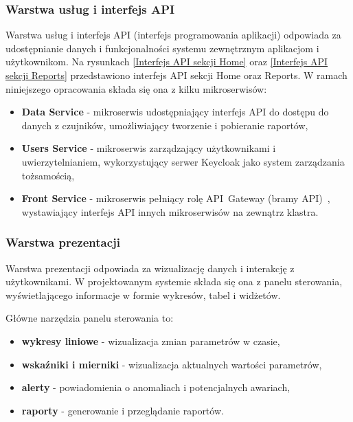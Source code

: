 \subsubsection{Warstwa usług i interfejs API}
\label{subsubsec:warstwa_uslug}

Warstwa usług i interfejs API (interfejs programowania aplikacji) odpowiada za udostępnianie danych i funkcjonalności systemu zewnętrznym aplikacjom i użytkownikom. Na rysunkach \ref{Interfejs API sekcji Home} oraz \ref{Interfejs API sekcji Reports} przedstawiono interfejs API sekcji Home oraz Reports. W ramach niniejszego opracowania składa się ona z kilku mikroserwisów:

\begin{itemize}
    \item \textbf{Data Service} - mikroserwis udostępniający interfejs API do dostępu do danych z czujników, umożliwiający tworzenie i pobieranie raportów,
    \item \textbf{Users Service} - mikroserwis zarządzający użytkownikami i uwierzytelnianiem, wykorzystujący serwer Keycloak jako system zarządzania tożsamością,
    \item \textbf{Front Service} - mikroserwis pełniący rolę \mbox{API Gateway} (bramy API)~\cite{api_gateway_definition}, wystawiający interfejs API innych mikroserwisów na zewnątrz klastra.
\end{itemize}


\subsubsection{Warstwa prezentacji}
\label{subsubsec:warstwa_prezentacji}

Warstwa prezentacji odpowiada za wizualizację danych i interakcję z użytkownikami.
W projektowanym systemie składa się ona z panelu sterowania, wyświetlającego informacje w formie wykresów, tabel i widżetów.

\vspace{0.3em}

Główne narzędzia panelu sterowania to:

\begin{itemize}
    \item \textbf{wykresy liniowe} - wizualizacja zmian parametrów w czasie,
    \item \textbf{wskaźniki i mierniki} - wizualizacja aktualnych wartości parametrów,
    \item \textbf{alerty} - powiadomienia o anomaliach i potencjalnych awariach,
    \item \textbf{raporty} - generowanie i przeglądanie raportów.
\end{itemize}


